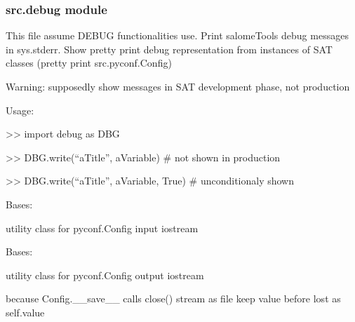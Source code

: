 \documentclass[a4paper,10pt,english]{sphinxmanual}
\begin{document}
\subsubsection{src.debug module}
\label{\detokenize{apidoc_src/src:module-src.debug}}\label{\detokenize{apidoc_src/src:src-debug-module}}
This file assume DEBUG functionalities use.
Print salomeTools debug messages in sys.stderr.
Show pretty print debug representation from instances of SAT classes 
(pretty print src.pyconf.Config)

\begin{DUlineblock}{0em}
\item[] Warning: supposedly show messages in SAT development phase, not production
\item[] 
\item[] Usage:
\item[] \textgreater{}\textgreater{} import debug as DBG
\item[] \textgreater{}\textgreater{} DBG.write(“aTitle”, aVariable)        \# not shown in production 
\item[] \textgreater{}\textgreater{} DBG.write(“aTitle”, aVariable, True)  \# unconditionaly shown 
\end{DUlineblock}

\begin{fulllineitems}
\label{\detokenize{apidoc_src/src:src.debug.InStream}}
Bases: 

utility class for pyconf.Config input iostream

\end{fulllineitems}


\begin{fulllineitems}
\label{\detokenize{apidoc_src/src:src.debug.OutStream}}
Bases: 

utility class for pyconf.Config output iostream

\begin{fulllineitems}
\label{\detokenize{apidoc_src/src:src.debug.OutStream.close}}
because Config.\_\_save\_\_ calls close() stream as file
keep value before lost as self.value

\end{fulllineitems}


\end{fulllineitems}
\end{document}
